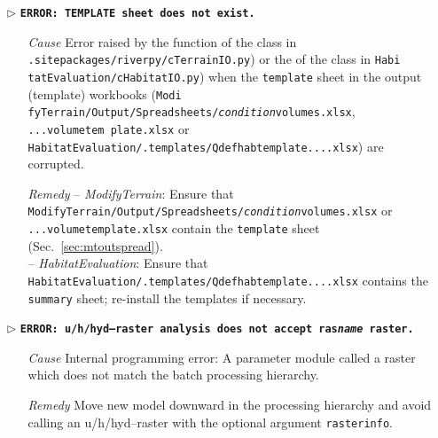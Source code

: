 \begin{itemize}
	\item[$\triangleright$]\textbf{\texttt{ERROR: TEMPLATE sheet does not exist.}}
	\begin{itemize}
		\item[\textit{Cause}\hspace{0.27cm}] Error raised by the  function of the  class in \texttt{.site{\myUnderscore}packages/riverpy/cTerrainIO.py}) or the  of the  class in \texttt{Habi tatEvaluation/cHabitatIO.py}) when the \texttt{template} sheet in the output (template) workbooks (\texttt{Modi fyTerrain/Output/Spreadsheets/\textit{condition}{\myUnderscore}volumes.xlsx}, \texttt{...volume{\myUnderscore}tem plate.xlsx} or \texttt{HabitatEvaluation/.templates/Q{\myUnderscore}def{\myUnderscore}hab{\myUnderscore}template{\myUnderscore}....xlsx}) are corrupted.
		\item[\textit{Remedy}] -- \textit{ModifyTerrain}: Ensure that \texttt{ModifyTerrain/Output/Spreadsheets/\textit{condition}{\myUnderscore}volumes.xlsx} or\\ \texttt{...volume{\myUnderscore}template.xlsx} contain the \texttt{template} sheet (Sec.~\ref{sec:mtoutspread}).\\
		-- \textit{HabitatEvaluation}: Ensure that \texttt{HabitatEvaluation/.templates/Q{\myUnderscore}def{\myUnderscore}hab{\myUnderscore}template{\myUnderscore}....xlsx} contains the \texttt{summary} sheet; re-install the templates if necessary.\\
	\end{itemize}
	
	\item[$\triangleright$] \textbf{\texttt{ERROR: u/h/hyd--raster analysis does not accept ras{\myUnderscore}\textit{name} raster.}}
	\begin{itemize}
		\item[\textit{Cause}\hspace{0.27cm}] Internal programming error: A parameter module called a raster which does not match the batch processing hierarchy.
		\item[\textit{Remedy}] Move new model downward in the processing hierarchy and avoid calling an u/h/hyd--raster with the optional argument \texttt{raster{\myUnderscore}info}.\\
	\end{itemize}
	

\end{itemize}
